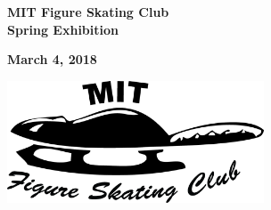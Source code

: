 \documentclass[12pt]{article}
\newcommand{\programnumber}[2]{{
  \vspace{0.1in}
  \textbf{#1}\\
  {\footnotesize #2}
}}
\begin{document}
\begin{multicols*}{2}
\vfill\null
\columnbreak


\begin{center}

\vspace*{1.5in}

{\Large \textbf{MIT Figure Skating Club}}\\
{\Large \textbf{Spring Exhibition}}

\vspace{0.2in}

{\large\textbf{March 4, 2018}}

\vspace{0.7in}

\includegraphics[width=3in]{fsclogo.png}

\end{center}

\vfill\null
\columnbreak


\begin{center}



\end{center}
\end{multicols*}
\end{document}
